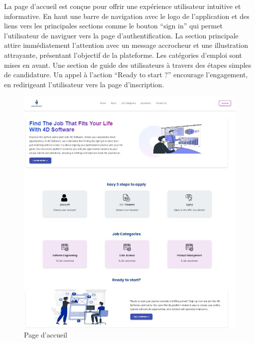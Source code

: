 La page  d’accueil est  conçue pour offrir une expérience utilisateur intuitive et 
informative. En haut une  barre  de navigation avec le logo de l’application et 
des liens vers les principales sections comme le bouton “sign in” qui permet l’utilisateur de  
naviguer vers la page d’authentification. La section principale attire immédiatement 
l’attention avec un message accrocheur et une illustration attrayante, présentant 
l'objectif de la  plateforme. Les catégories d’emploi sont mises en  avant. 
Une section de guide des utilisateurs à travers des étapes simples de candidature. 
Un appel à l’action “Ready to start ?”  encourage l'engagement, en  redirigeant 
l’utilisateur vers la page d’inscription.  
\begin{figure}[htbp]
   \centering
   \includegraphics[scale=0.7]{screens/accueil2.jpg} 
   \caption{Page d'accueil}
   \label{fig:accueil}
\end{figure}

\vspace{2cm}
